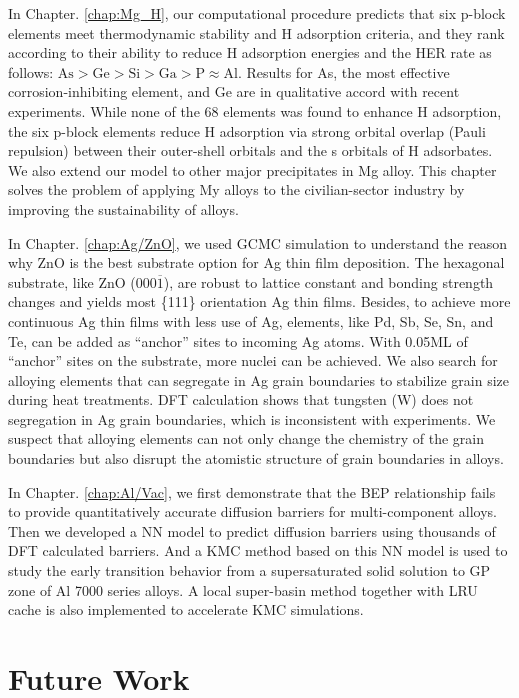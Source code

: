 In Chapter. \ref{chap:Mg_H}, our computational procedure predicts that six p-block elements meet thermodynamic stability and H adsorption criteria, and they rank according to their ability to reduce H adsorption energies and the \ac{HER} rate as follows: $\text{As} > \text{Ge} > \text{Si} > \text{Ga} > \text{P} \approx \text{Al}$. Results for As, the most effective corrosion-inhibiting element, and Ge are in qualitative accord with recent experiments. While none of the 68 elements was found to enhance H adsorption, the six p-block elements reduce H adsorption via strong orbital overlap (Pauli repulsion) between their outer-shell orbitals and the s orbitals of H adsorbates. We also extend our model to other major precipitates in Mg alloy. This chapter solves the problem of applying My alloys to the civilian-sector industry by improving the sustainability of alloys.

In Chapter. \ref{chap:Ag/ZnO}, we used \ac{GCMC} simulation to understand the reason why ZnO is the best substrate option for Ag thin film deposition. The hexagonal substrate, like ZnO (000$\overline{1}$), are robust to lattice constant and bonding strength changes and yields most \{111\} orientation Ag thin films. Besides, to achieve more continuous Ag thin films with less use of Ag, elements, like Pd, Sb, Se, Sn, and Te, can be added as ``anchor'' sites to incoming Ag atoms. With 0.05\ac{ML} of ``anchor'' sites on the substrate, more nuclei can be achieved. We also search for alloying elements that can segregate in Ag grain boundaries to stabilize grain size during heat treatments. \ac{DFT} calculation shows that tungsten (W) does not segregation in Ag grain boundaries, which is inconsistent with experiments. We suspect that alloying elements can not only change the chemistry of the grain boundaries but also disrupt the atomistic structure of grain boundaries in alloys.

In Chapter. \ref{chap:Al/Vac}, we first demonstrate that the \acf{BEP} relationship fails to provide quantitatively accurate diffusion barriers for multi-component alloys. Then we developed a \ac{NN} model to predict diffusion barriers using thousands of \ac{DFT} calculated barriers. And a \ac{KMC} method based on this \ac{NN} model is used to study the early transition behavior from a supersaturated solid solution to \ac{GP} zone of Al 7000 series alloys. A local super-basin method together with \ac{LRU} cache is also implemented to accelerate \ac{KMC} simulations.


\section{Future Work}

